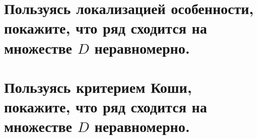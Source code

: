 \documentclass[a4paper, fleqn]{article}
\begin{document}
    
    
    \section*{Пользуясь локализацией особенности, покажите, что ряд сходится на множестве $D$ неравномерно.}
    
    
    
    
    \section*{Пользуясь критерием Коши, покажите, что ряд сходится на множестве $D$ неравномерно.}
    
    
    
\end{document}
